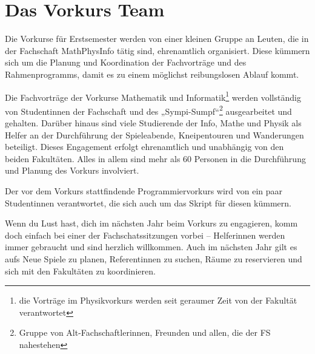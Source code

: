 \vspace{-3mm}

\section{Das Vorkurs Team}
\vspace{-1mm}

Die Vorkurse für Erstsemester werden von einer kleinen Gruppe an Leuten, die in der Fachschaft MathPhysInfo tätig sind, ehrenamtlich organisiert. Diese kümmern sich um die Planung und Koordination der Fachvorträge und des Rahmenprogramms, damit es zu einem möglichst reibungslosen Ablauf kommt.

Die Fachvorträge der Vorkurse Mathematik und Informatik\footnote{die Vorträge im Physikvorkurs werden seit geraumer Zeit von der Fakultät verantwortet} werden vollständig von Studentinnen der Fachschaft und des „Sympi-Sumpf“\footnote{Gruppe von Alt-Fachschaftlerinnen, Freunden und allen, die der FS nahestehen} ausgearbeitet und gehalten. Darüber hinaus sind viele Studierende der Info, Mathe und Physik als Helfer an der Durchführung der Spieleabende, Kneipentouren und Wanderungen beteiligt. Dieses Engagement erfolgt ehrenamtlich und unabhängig von den beiden Fakultäten. Alles in allem sind mehr als 60 Personen in die Durchführung und Planung des Vorkurs involviert.

Der vor dem Vorkurs stattfindende Programmiervorkurs wird von ein paar Studentinnen verantwortet, die sich auch um das Skript für diesen kümmern.

Wenn du Lust hast, dich im nächsten Jahr beim Vorkurs zu engagieren, komm doch einfach bei einer der Fachschatssitzungen vorbei -- Helferinnen werden immer gebraucht und sind herzlich willkommen. Auch im nächsten Jahr gilt es aufs Neue Spiele zu planen, Referentinnen zu suchen, Räume zu reservieren und sich mit den Fakultäten zu koordinieren.
